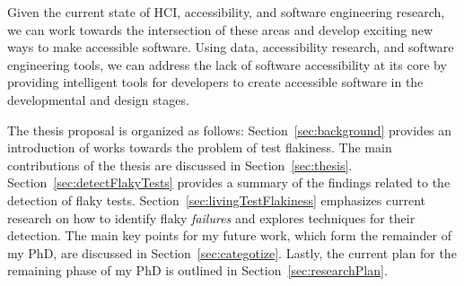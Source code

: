 Given the current state of HCI, accessibility, and software engineering research, we can work towards the intersection of these areas and develop exciting new ways to make accessible software. Using data, accessibility research, and software engineering tools, we can address the lack of software accessibility at its core by providing intelligent tools for developers to create accessible software in the developmental and design stages. 


The thesis proposal is organized as follows: Section~\ref{sec:background} provides an introduction of works towards the problem of test flakiness. The main contributions of the thesis are discussed in Section~\ref{sec:thesis}. Section~\ref{sec:detectFlakyTests} provides a summary of the findings related to the detection of flaky tests. Section~\ref{sec:livingTestFlakiness} emphasizes current research on how to identify flaky \emph{failures} and explores techniques for their detection. The main key points for my future work, which form the remainder of my PhD, are discussed in Section~\ref{sec:categotize}. Lastly, the current plan for the remaining phase of my PhD is outlined in Section~\ref{sec:researchPlan}.
